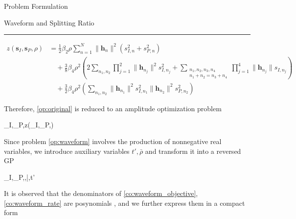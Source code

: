 \documentclass{IEEEtran}
\begin{document}
\begin{section}{Problem Formulation}
\begin{subsection}{Waveform and Splitting Ratio}
\begin{equation}
		\end{equation}
		\begin{figure*}[b]
			\hrule
			\begin{equation}\label{eq:z_waveform}
				\begin{split}
					z(\boldsymbol{s}_I,\boldsymbol{s}_P,\rho)
					& = \frac{1}{2}{\beta_2}{\rho} \sum_{n=1}^N \lVert{\boldsymbol{h}_n}\rVert^2(s_{I,n}^2+s_{P,n}^2)\\
					& \quad + \frac{3}{8}{\beta_4}{\rho^2} \left( 2\sum_{n_1,n_2} \prod_{j=1}^2 \lVert{\boldsymbol{h}_{n_j}}\rVert^2 s_{I,{n_j}}^2 + \sum_{\substack{{n_1},{n_2},{n_3},{n_4}\\{n_1}+{n_2}={n_3}+{n_4}}} \prod_{j=1}^4 \lVert{\boldsymbol{h}_{n_j}}\rVert s_{I,{n_j}} \right)\\
					& \quad + \frac{3}{2}{\beta_4}{\rho^2} \left( \sum_{n_1,n_2} \lVert{\boldsymbol{h}_{n_1}}\rVert^2 s_{I,{n_1}}^2 \lVert{\boldsymbol{h}_{n_2}}\rVert^2 s_{P,{n_2}}^2 \right)
				\end{split}
			\end{equation}
		\end{figure*}
		Therefore, \ref{op:original} is reduced to an amplitude optimization problem
		\begin{maxi!}
			{\boldsymbol{s}_I,_P,\rho}{z(\boldsymbol{s}_I,_P,\rho)}{\label{op:waveform}}{}
		\end{maxi!}
		Since problem \ref{op:waveform} involves the production of nonnegative real variables, we introduce auxiliary variables $t',\bar{\rho}$ and transform it into a reversed GP
		\begin{mini!}
			{\boldsymbol{s}_I,_P,\rho,\bar{\rho},t'}{}{\label{op:waveform_rgp}}{}
			\label{co:waveform_power}
			\label{co:waveform_objective}
			\label{co:waveform_rate}
		\end{mini!}
		It is observed that the denominators of \ref{co:waveform_objective}, \ref{co:waveform_rate} are posynomials \cite{Boyd2007}, and we further express them in a compact form

\end{subsection}
\end{section}
\end{document}

